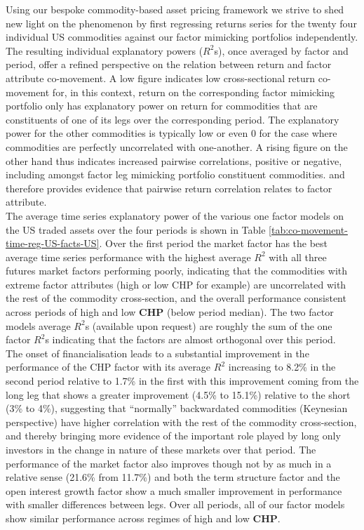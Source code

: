 \documentclass[]{elsarticle} %
\begin{document}
\bigskip\bigskip\setlength{\parindent}{0pt}

Using our bespoke commodity-based asset pricing framework we strive to shed new light on the phenomenon by first regressing returns series for the twenty four individual US commodities against our factor mimicking portfolios independently. The resulting individual explanatory powers (\(R^2\)s), once averaged by factor and period, offer a refined perspective on the relation between return and factor attribute co-movement. A low figure indicates low cross-sectional return co-movement for, in this context, return on the corresponding factor mimicking portfolio only has explanatory power on return for commodities that are constituents of one of its legs over the corresponding period. The explanatory power for the other commodities is typically low or even 0 for the case where commodities are perfectly uncorrelated with one-another. A rising figure on the other hand thus indicates increased pairwise correlations, positive or negative, including amongst factor leg mimicking portfolio constituent commodities. and therefore provides evidence that pairwise return correlation relates to factor attribute.\\
The average time series explanatory power of the various one factor models on the US traded assets over the four periods is shown in Table \ref{tab:co-movement-time-reg-US-facts-US}. Over the first period the market factor has the best average time series performance with the highest average \(R^{2}\) with all three futures market factors performing poorly, indicating that the commodities with extreme factor attributes (high or low CHP for example) are uncorrelated with the rest of the commodity cross-section, and the overall performance consistent across periods of high and low \textbf{CHP} (below period median). The two factor models average \(R^{2}\)s (available upon request) are roughly the sum of the one factor \(R^{2}\)s indicating that the factors are almost orthogonal over this period.\\
The onset of financialisation leads to a substantial improvement in the performance of the CHP factor with its average \(R^{2}\) increasing to 8.2\% in the second period relative to 1.7\% in the first with this improvement coming from the long leg that shows a greater improvement (4.5\% to 15.1\%) relative to the short (3\% to 4\%), suggesting that ``normally'' backwardated commodities (Keynesian perspective) have higher correlation with the rest of the commodity cross-section, and thereby bringing more evidence of the important role played by long only investors in the change in nature of these markets over that period. The performance of the market factor also improves though not by as much in a relative sense (21.6\% from 11.7\%) and both the term structure factor and the open interest growth factor show a much smaller improvement in performance with smaller differences between legs. Over all periods, all of our factor models show similar performance across regimes of high and low \textbf{CHP}.
\end{document}
